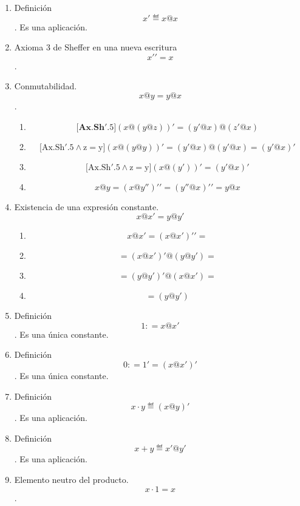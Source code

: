 \begin{enumerate}
\begin{enumerate}
\begin{enumerate}
\begin{enumerate}
        \begin{enumerate}
        \def\labelenumv{\arabic{enumv}.}
        \item
          Definición \[x' ≝ x@x\]. Es una aplicación.
        \item
          Axioma 3 de Sheffer en una nueva escritura \[x'{' = x}\].
        \item
          Conmutabilidad. \[x@{y = y}@x\].

          \begin{enumerate}
          \def\labelenumvi{\arabic{enumvi}.}
          \tightlist
          \item
            \[\mathbf{\lbrack{{Ax.Sh}\mathrm{'}.5}\rbrack}{({x@{({y@z})}})}{' = {({y'@x})}}@{({z'@x})}\]
          \item
            \[\mathbf{\mathrm{\lbrack{{Ax.Sh}'{{.5 \land z} = y}}\rbrack}}{({x@{({y@y})}})}{' = {({y'@x})}}@{{({y'@x})} = {({y'@x})}}'\]
          \item
            \[\mathbf{\mathrm{\lbrack{{Ax.Sh}'{{.5 \land z} = y}}\rbrack}}{({x@{({y'})}})}{' = {({y'@x})}}'\]
          \item
            \[x@{y = {({x@y''})}}'{' = {({y''@x})}}'{' = {y@x}}\]
          \end{enumerate}
        \item
          Existencia de una expresión constante. \[x@x{' = y}@y'\]

          \begin{enumerate}
          \def\labelenumvi{\arabic{enumvi}.}
          \tightlist
          \item
            \[{{x@{x'}} = {({x@{x'}})}}'{' =}\]
          \item
            \[{= {({x@{x'}})}}'@{{({y@{y'}})} =}\]
          \item
            \[{= {({y@{y'}})}}'@{{({x@{x'}})} =}\]
          \item
            \[= {({y@{y'}})}\]
          \end{enumerate}
        \item
          Definición \[1{: = x}@x'\]. Es una única constante.
        \item
          Definición \[0{: = 1}{' = {({x@x'})}}'\]. Es una única
          constante.
        \item
          Definición \[{x \cdot y} ≝ {({x@y})}'\]. Es una aplicación.
        \item
          Definición \[{x + y} ≝ {x'@y'}\]. Es una aplicación.
        \item
          Elemento neutro del producto. \[{x \cdot 1} = x\].


\end{enumerate}
\end{enumerate}
\end{enumerate}
\end{enumerate}
\end{enumerate}
